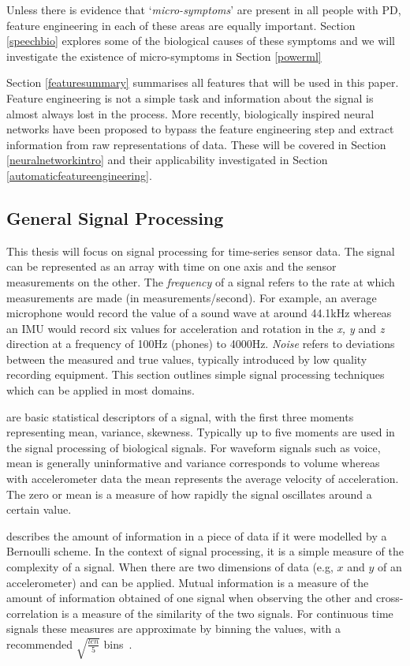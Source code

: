 \documentclass[12pt, twoside]{book}
\renewcommand\emph[1]{\textit{\color{USred}{#1}}}
\begin{document}
Unless there is evidence that `\textit{micro-symptoms}' are present in all people with PD, feature engineering in each of these areas are equally important. Section \ref{speechbio} explores some of the biological causes of these symptoms and we will investigate the existence of  micro-symptoms in Section \ref{powerml}


Section \ref{featuresummary} summarises all features that will be used in this paper. Feature engineering is not a simple task and information about the signal is almost always lost in the process. More recently, biologically inspired neural networks have been proposed to bypass the feature engineering step and extract information from raw representations of data. These will be covered in Section \ref{neuralnetworkintro} and their applicability investigated in Section \ref{automaticfeatureengineering}.

\subsection{General Signal Processing}
\label{generalsignalproc}
This thesis will focus on signal processing for time-series sensor data. The signal can be represented as an array with time on one axis and the sensor measurements on the other. The \textit{frequency} of a signal refers to the rate at which measurements are made (in measurements/second). For example, an average microphone would record the value of a sound wave at around 44.1kHz whereas an IMU would record six values for acceleration and rotation in the \textit{x, y} and \textit{z} direction at a frequency of 100Hz (phones) to 4000Hz. \textit{Noise} refers to deviations between the measured and true values, typically introduced by low quality recording equipment. This section outlines simple signal processing techniques which can be applied in most domains.


\emph{Moments} are basic statistical descriptors of a signal, with the first three moments representing mean, variance, skewness. Typically up to five moments are used in the signal processing of biological signals. For waveform signals such as voice, mean is generally uninformative and variance corresponds to volume whereas with accelerometer data the mean represents the average velocity of acceleration.  The zero or mean \emph{crossing rate} is a measure of how rapidly the signal oscillates around a certain value.

\emph{Entropy} describes the amount of information in a piece of data if it were modelled by a Bernoulli scheme. In the context of signal processing, it is a simple measure of the complexity of a signal. When there are two dimensions of data (e.g, $x$ and $y$ of an accelerometer) \emph{mutual information} and \emph{cross correlation} can be applied. Mutual information is a measure of the amount of information obtained of one signal when observing the other and cross-correlation is a measure of the similarity of the two signals. For continuous time signals these measures are approximate by binning the values, with a recommended $\sqrt{\frac{len}{5}}$ bins~\cite{entropymeasures}.
\end{document}
